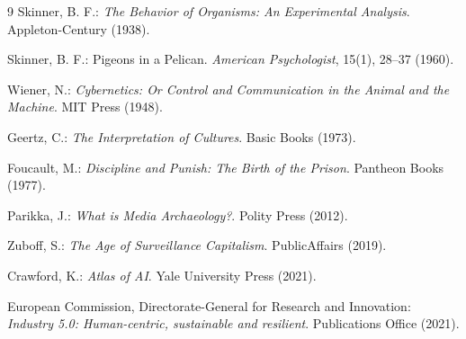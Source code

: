 \documentclass[11pt, a4paper]{article}
\begin{document}
\begin{thebibliography}{9}
Skinner, B. F.: \textit{The Behavior of Organisms: An Experimental Analysis}. Appleton-Century (1938).

Skinner, B. F.: Pigeons in a Pelican. \textit{American Psychologist}, 15(1), 28--37 (1960).

Wiener, N.: \textit{Cybernetics: Or Control and Communication in the Animal and the Machine}. MIT Press (1948).

Geertz, C.: \textit{The Interpretation of Cultures}. Basic Books (1973).

Foucault, M.: \textit{Discipline and Punish: The Birth of the Prison}. Pantheon Books (1977).

Parikka, J.: \textit{What is Media Archaeology?}. Polity Press (2012).

Zuboff, S.: \textit{The Age of Surveillance Capitalism}. PublicAffairs (2019).

Crawford, K.: \textit{Atlas of AI}. Yale University Press (2021).

European Commission, Directorate-General for Research and Innovation: \textit{Industry 5.0: Human-centric, sustainable and resilient}. Publications Office (2021).
\end{thebibliography}
\end{document}
